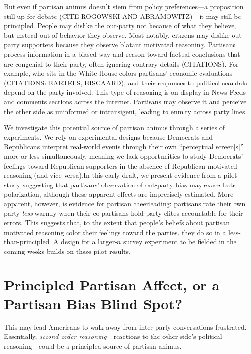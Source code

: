 \documentclass[12pt, letterpaper]{article}
\begin{document}
{But even if partisan animus doesn't stem from policy preferences---a proposition still up for debate (CITE ROGOWSKI AND ABRAMOWITZ)---it may still be principled. People may dislike the out-party not because of what they believe, but instead out of behavior they observe. Most notably, citizens may dislike out-party supporters because they observe blatant motivated reasoning. Partisans process information in a biased way and reason toward factual conclusions that are congenial to their party, often ignoring contrary details (CITATIONS). For example, who sits in the White House colors partisans' economic evaluations (CITATIONS: BARTELS, BISGAARD), and their responses to political scandals depend on the party involved. This type of reasoning is on display in News Feeds and comments sections across the internet. Partisans may observe it and perceive the other side as uninformed or intransigent, leading to enmity across party lines.

We investigate this potential source of partisan animus through a series of experiments. We rely on experimental designs because Democrats and Republicans interpret real-world events through their own ``perceptual screen[s]'' \citep{campbell1960} more or less simultaneously, meaning we lack opportunities to study Democrats' feelings toward Republican supporters in the absence of Republican motivated reasoning (and vice versa).In this early draft, we present evidence from a pilot study suggesting that partisans' observation of out-party bias may exacerbate polarization, although these apparent effects are imprecisely estimated. More apparent, however, is evidence for partisan cheerleading: partisans rate their own party \emph{less} warmly when their co-partisans hold party elites accountable for their errors. This suggests that, to the extent that people's beliefs about partisan motivated reasoning color their feelings toward the parties, they do so in a less-than-principled. A design for a larger-$n$ survey experiment to be fielded in the coming weeks builds on these pilot results.

\section*{Principled Partisan Affect, or a Partisan Bias Blind Spot?}

This may lead Americans to walk away from inter-party conversations frustrated. Essentially, \emph{second-order reasoning}---reactions to the other side's political reasoning---could be a principled source of partisan animus. 

}
\end{document}
